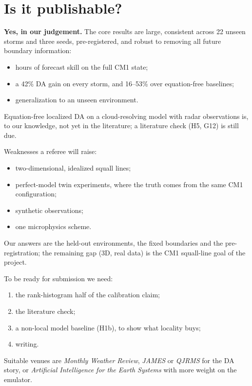 \documentclass[11pt]{article}
\begin{document}
\section{Is it publishable?}\label{sec:verdict}
\textbf{Yes, in our judgement.} The core results are large, consistent across 22 unseen storms and three seeds, pre-registered, and robust to removing all future boundary information:
\begin{itemize}
\item hours of forecast skill on the full CM1 state;
\item a 42\% DA gain on every storm, and 16--53\% over equation-free baselines;
\item generalization to an unseen environment.
\end{itemize}
Equation-free localized DA on a cloud-resolving model with radar observations is, to our knowledge, not yet in the literature; a literature check (H5, G12) is still due.

Weaknesses a referee will raise:
\begin{itemize}
\item two-dimensional, idealized squall lines;
\item perfect-model twin experiments, where the truth comes from the same CM1 configuration;
\item synthetic observations;
\item one microphysics scheme.
\end{itemize}
Our answers are the held-out environments, the fixed boundaries and the pre-registration; the remaining gap (3D, real data) is the CM1 squall-line goal of the project.

To be ready for submission we need:
\begin{enumerate}
\item the rank-histogram half of the calibration claim;
\item the literature check;
\item a non-local model baseline (H1b), to show what locality buys;
\item writing.
\end{enumerate}
Suitable venues are \emph{Monthly Weather Review}, \emph{JAMES} or \emph{QJRMS} for the DA story, or \emph{Artificial Intelligence for the Earth Systems} with more weight on the emulator.
\end{document}

